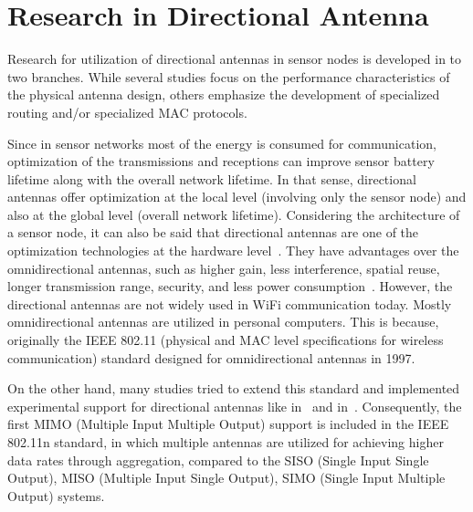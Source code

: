 \documentclass[12pt, oneandhalf, chaparabic, sees, ms]{metu}
\begin{document}
\section{Research in Directional Antenna}\label{santresearch}
%
%

Research for utilization of directional antennas in sensor nodes is developed in to two branches. While several studies focus on the 
performance characteristics of the physical antenna design, others emphasize the development of specialized routing and/or specialized MAC protocols.

Since in sensor networks most of the energy is consumed for communication, 
optimization of the transmissions and receptions can improve sensor battery lifetime along with the overall network lifetime. In that sense, directional antennas
offer optimization at the local level (involving only the sensor node) and also at the global level (overall network lifetime).
Considering the architecture of a sensor node, it can also be said that
directional antennas are one of the optimization technologies at the hardware level~\cite{winters2006, jamshed2018, rault2014}.
They have advantages over the omnidirectional antennas, such as higher gain, less interference, spatial reuse, longer transmission range, security, and 
less power consumption~\cite{dai2011, georgiou2015, curiac2016, cisco}. 
However, the directional antennas are not widely used in WiFi communication today. Mostly omnidirectional antennas are utilized in personal computers.
This is because, originally the IEEE 802.11 (physical and MAC level specifications for wireless communication) standard designed for omnidirectional antennas in 1997. 


On the other hand, many studies tried to extend this standard and implemented experimental support for directional antennas like in~\cite{ko2000} and in~\cite{zhu2006}.
Consequently, the first MIMO (Multiple Input Multiple Output) support is included in the IEEE 802.11n standard, 
in which multiple antennas are utilized for achieving higher data rates through aggregation,
compared to the SISO (Single Input Single Output), MISO (Multiple Input Single Output), SIMO (Single Input Multiple Output) systems. 
\end{document}
